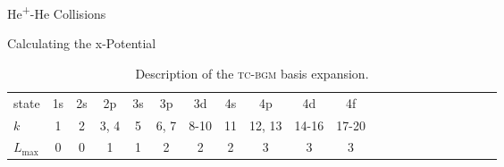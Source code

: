 \documentclass[letterpaper, 11 pt]{report}
\begin{document}
\begin{chapter}{\texorpdfstring{He\textsuperscript{+}}{He+}-He Collisions \label{chap:hephe}}
\begin{section}{Calculating the x-Potential \label{sec:pot}}
      \begin{table}
         \centering
         \caption{Description of the \textsc{tc-bgm} basis expansion. \label{tab:basis}}
         \begin{tabular}{lcccccccccccccccccccc}
            \toprule
            state            & 1s & 2s & 2p   & 3s & 3p   & 3d      & 4s & 4p     & 4d      & 4f \\
            $k$              & 1  & 2  & 3, 4 & 5  & 6, 7 & 8{-}10  & 11 & 12, 13 & 14{-}16 & 17{-}20 \\
            $L_\mathrm{max}$ & 0  & 0  & 1    & 1  & 2    & 2       & 2  & 3      & 3       & 3 \\
            \bottomrule
         \end{tabular}
      \end{table}


\end{section}
\end{chapter}
\end{document}

